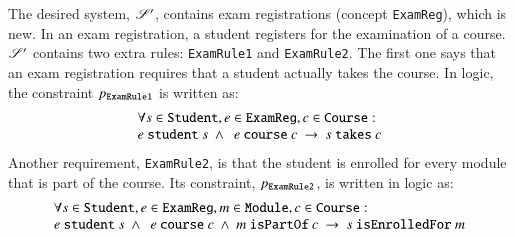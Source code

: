 \documentclass{elsarticle}
\begin{document}
   The desired system, $\mathscr{S}'$, contains exam registrations (concept \verb-ExamReg-), which is new.
   In an exam registration, a student registers for the examination of a course.
   $\mathscr{S}'$ contains two extra rules: \verb-ExamRule1- and \verb-ExamRule2-.
   The first one says that an exam registration requires that a student actually takes the course.
   In logic, the constraint $p_{\tt ExamRule1}$ is written as:
\[\begin{array}{l}\forall s\in\text{\tt Student}, e\in\text{\tt ExamReg}, c\in\text{\tt Course}:\\
   e\ \text{\tt student}\ s\ \wedge\ \ e\ \text{\tt course}\ c\ \rightarrow\ s\ \text{\tt takes}\ c\\
\end{array}\]
   Another requirement, \verb-ExamRule2-, is that the student is enrolled for every module that is part of the course.
   Its constraint, $p_{\tt ExamRule2}$, is written in logic as:
\[\begin{array}{l}\forall s\in\text{\tt Student}, e\in\text{\tt ExamReg}, m\in\text{\tt Module}, c\in\text{\tt Course}:\\
   e\ \text{\tt student}\ s\ \wedge\ \ e\ \text{\tt course}\ c\ \wedge\ m\ \text{\tt isPartOf}\ c\ \rightarrow\ s\ \text{\tt isEnrolledFor}\ m
\end{array}\]
\end{document}
